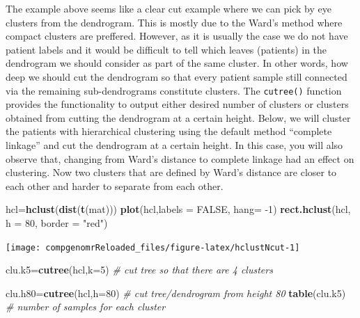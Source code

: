 \documentclass[12pt,]{krantz}
\newenvironment{Shaded}{\begin{snugshade}}{\end{snugshade}}
\newcommand{\CommentTok}[1]{\textcolor[rgb]{0.56,0.35,0.01}{\textit{#1}}}
\newcommand{\DataTypeTok}[1]{\textcolor[rgb]{0.13,0.29,0.53}{#1}}
\newcommand{\DecValTok}[1]{\textcolor[rgb]{0.00,0.00,0.81}{#1}}
\newcommand{\KeywordTok}[1]{\textcolor[rgb]{0.13,0.29,0.53}{\textbf{#1}}}
\newcommand{\NormalTok}[1]{#1}
\newcommand{\OtherTok}[1]{\textcolor[rgb]{0.56,0.35,0.01}{#1}}
\newcommand{\StringTok}[1]{\textcolor[rgb]{0.31,0.60,0.02}{#1}}
\theoremstyle{definition}
\theoremstyle{definition}
\theoremstyle{definition}
\theoremstyle{remark}
\begin{document}
The example above seems like a clear cut example where we can pick by
eye clusters from the dendrogram. This is mostly due to the Ward's
method where compact clusters are preffered. However, as it is usually
the case we do not have patient labels and it would be difficult to tell
which leaves (patients) in the dendrogram we should consider as part of
the same cluster. In other words, how deep we should cut the dendrogram
so that every patient sample still connected via the remaining
sub-dendrograms constitute clusters. The \texttt{cutree()} function
provides the functionality to output either desired number of clusters
or clusters obtained from cutting the dendrogram at a certain height.
Below, we will cluster the patients with hierarchical clustering using
the default method ``complete linkage'' and cut the dendrogram at a
certain height. In this case, you will also observe that, changing from
Ward's distance to complete linkage had an effect on clustering. Now two
clusters that are defined by Ward's distance are closer to each other
and harder to separate from each other.

\begin{Shaded}
\begin{Highlighting}[]
\NormalTok{hcl=}\KeywordTok{hclust}\NormalTok{(}\KeywordTok{dist}\NormalTok{(}\KeywordTok{t}\NormalTok{(mat)))}
\KeywordTok{plot}\NormalTok{(hcl,}\DataTypeTok{labels =} \OtherTok{FALSE}\NormalTok{, }\DataTypeTok{hang=} \DecValTok{-1}\NormalTok{)}
\KeywordTok{rect.hclust}\NormalTok{(hcl, }\DataTypeTok{h =} \DecValTok{80}\NormalTok{, }\DataTypeTok{border =} \StringTok{"red"}\NormalTok{)}
\end{Highlighting}
\end{Shaded}

\begin{center}\texttt{[image: compgenomrReloaded\_files/figure-latex/hclustNcut-1]} \end{center}

\begin{Shaded}
\begin{Highlighting}[]
\NormalTok{clu.k5=}\KeywordTok{cutree}\NormalTok{(hcl,}\DataTypeTok{k=}\DecValTok{5}\NormalTok{) }\CommentTok{# cut tree so that there are 4 clusters}

\NormalTok{clu.h80=}\KeywordTok{cutree}\NormalTok{(hcl,}\DataTypeTok{h=}\DecValTok{80}\NormalTok{) }\CommentTok{# cut tree/dendrogram from height 80}
\KeywordTok{table}\NormalTok{(clu.k5) }\CommentTok{# number of samples for each cluster}
\end{Highlighting}
\end{Shaded}
\end{document}
